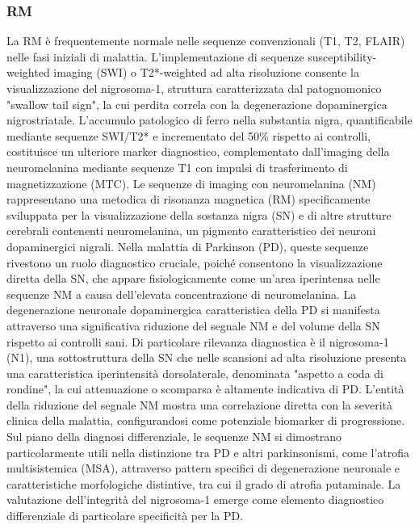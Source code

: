 \subsubsection{RM}
La RM è frequentemente normale nelle sequenze convenzionali (T1, T2, FLAIR) nelle fasi iniziali di malattia. L'implementazione di sequenze susceptibility-weighted imaging (SWI) o T2*-weighted ad alta risoluzione consente la visualizzazione del nigrosoma-1, struttura caratterizzata dal patognomonico "swallow tail sign", la cui perdita correla con la degenerazione dopaminergica nigrostriatale. L'accumulo patologico di ferro nella substantia nigra, quantificabile mediante sequenze SWI/T2* e incrementato del 50\% rispetto ai controlli, costituisce un ulteriore marker diagnostico, complementato dall'imaging della neuromelanina mediante sequenze T1 con impulsi di trasferimento di magnetizzazione (MTC). Le sequenze di imaging con neuromelanina (NM) rappresentano una metodica di risonanza magnetica (RM) specificamente sviluppata per la visualizzazione della sostanza nigra (SN) e di altre strutture cerebrali contenenti neuromelanina, un pigmento caratteristico dei neuroni dopaminergici nigrali. Nella malattia di Parkinson (PD), queste sequenze rivestono un ruolo diagnostico cruciale, poiché consentono la visualizzazione diretta della SN, che appare fisiologicamente come un'area iperintensa nelle sequenze NM a causa dell'elevata concentrazione di neuromelanina. La degenerazione neuronale dopaminergica caratteristica della PD si manifesta attraverso una significativa riduzione del segnale NM e del volume della SN rispetto ai controlli sani. Di particolare rilevanza diagnostica è il nigrosoma-1 (N1), una sottostruttura della SN che nelle scansioni ad alta risoluzione presenta una caratteristica iperintensità dorsolaterale, denominata "aspetto a coda di rondine", la cui attenuazione o scomparsa è altamente indicativa di PD. L'entità della riduzione del segnale NM mostra una correlazione diretta con la severità clinica della malattia, configurandosi come potenziale biomarker di progressione. Sul piano della diagnosi differenziale, le sequenze NM si dimostrano particolarmente utili nella distinzione tra PD e altri parkinsonismi, come l'atrofia multisistemica (MSA), attraverso pattern specifici di degenerazione neuronale e caratteristiche morfologiche distintive, tra cui il grado di atrofia putaminale. La valutazione dell'integrità del nigrosoma-1 emerge come elemento diagnostico differenziale di particolare specificità per la PD.

